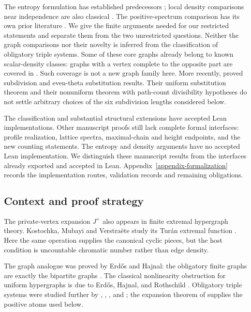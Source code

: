 \documentclass[a4paper,11pt,reqno]{amsart}
\theoremstyle{plain}
\theoremstyle{definition}
\theoremstyle{remark}
\begin{document}
The entropy formulation has established predecessors
\citep{csikvarilin2017,szegedy2015}; local density comparisons near independence
are also classical \citep{lovasz2010}.  The positive-spectrum comparison has
its own prior literature \citep{sidorenko2021}.  We give the finite arguments
needed for our restricted statements and separate them from the two
unrestricted questions.  Neither the graph comparisons nor their novelty
is inferred from the classification of obligatory triple systems.
Some of these core graphs already belong to known scalar-density classes:
graphs with a vertex complete to the opposite part are covered in
\citet{conlonfoxsudakov2012}.  Such coverage is not a new graph family here.
More recently, \citet{imliliu2026} proved subdivision and even-theta
substitution results.  Their uniform substitution theorem and their
nonuniform theorem with path-count divisibility hypotheses do not settle
arbitrary choices of the six subdivision lengths considered below.

The classification and substantial structural extensions have accepted
Lean implementations.  Other manuscript proofs still lack complete formal
interfaces: profile realization, lattice spectra, maximal-chain and height
endpoints, and the new counting statements.  The entropy and density
arguments have no accepted Lean implementation.  We distinguish these
manuscript results from the interfaces already exported and accepted in Lean.
Appendix~\ref{appendix-formalization} records the implementation routes,
validation records and remaining obligations.

\subsection*{Context and proof strategy}

The private-vertex expansion $J^+$ also appears in finite extremal
hypergraph theory.  Kostochka, Mubayi and Verstra{\"e}te study its
Tur{\'a}n extremal function \citep{kostochkamubayiverstraete2015}.
Here the same operation supplies the canonical cyclic pieces, but
the host condition is uncountable chromatic number rather than edge density.

The graph analogue was proved by Erdős and Hajnal: the obligatory finite
graphs are exactly the bipartite graphs
\citep[Corollary~5.6 and Theorem~7.4]{erdoshajnal1966}.  The classical
nonlinearity obstruction for uniform hypergraphs is due to Erdős, Hajnal,
and Rothschild \citep[Theorem~2, p.~532]{ehr1973}.  Obligatory triple
systems were studied further by \citet{egh1975}, \citet{komjath2001},
\citet{hajnalkomjath2008}, and \citet{komjath2008}; the expansion theorem of
\citet[Theorem~1.2]{reiher2024} supplies the positive atoms used below.
\end{document}
